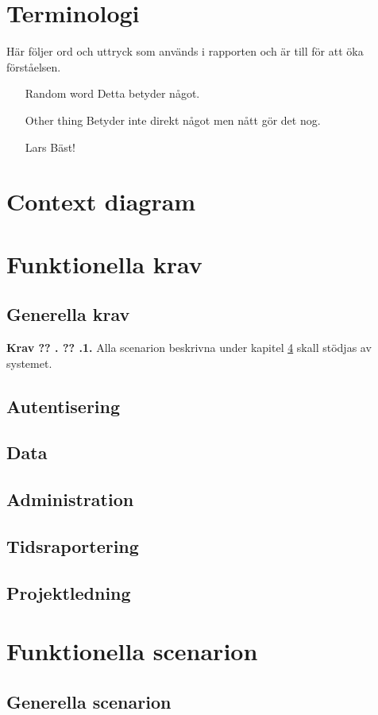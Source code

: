 \documentclass[a4paper]{article}
\newcommand\getcurrentref[1]{%
 \ifnumequal{\value{#1}}{0}
  {??}
  {\the\value{#1}}%
}
\newcommand\requirement[2]{
	\numberedrow{Krav}{#1}{#2}
}
\newcommand\numberedrow[3]{
	\noindent
	\textbf{#1 \getcurrentref{section}.\getcurrentref{subsection}.#2.} #3
	
}
\begin{document}
\section{Terminologi}
Här följer ord och uttryck som används i rapporten och är till för att öka förståelsen.
\begin{itemize}
\item [Random word] Detta betyder något.
\item [Other thing] Betyder inte direkt något men nått gör det nog.
\item [Lars] Bäst!
\end{itemize}
\section{Context diagram}
\section{Funktionella krav}
\subsection{Generella krav}
 \requirement{1}{Alla scenarion beskrivna under kapitel \ref{scenarion} skall stödjas av systemet.}
\subsection{Autentisering}
\subsection{Data}
\subsection{Administration}
\subsection{Tidsraportering}
\subsection{Projektledning}
\section{Funktionella scenarion}
\label{scenarion}
\subsection{Generella scenarion}
\end{document}
